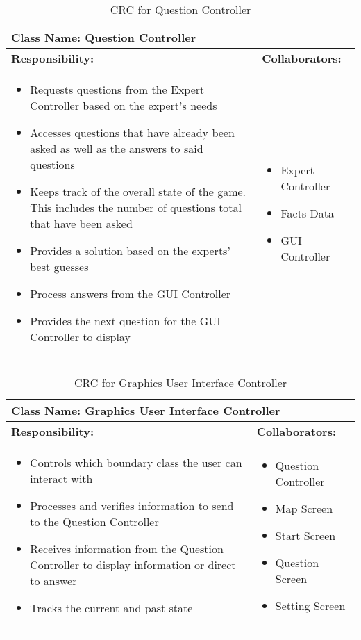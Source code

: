 \documentclass[titlepage]{article}
\begin{document}
	
	\begin{longtable}{| p{} | p{} |}
			\hline
			 \multicolumn{2}{|l|}{\textbf{Class Name: Question Controller}} \\
			\hline
			\textbf{Responsibility:} & \textbf{Collaborators:} \\
			\hline
				\begin{itemize}
					\item Requests questions from the Expert Controller based on the expert's needs
					\item Accesses questions that have already been asked as well as the answers to said questions
					\item Keeps track of the overall state of the game. This includes the number of questions total that have been asked
					\item Provides a solution based on the experts' best guesses
					\item Process answers from the GUI Controller
					\item Provides the next question for the GUI Controller to display
				\end{itemize} & 
				\begin{itemize}
					\item Expert Controller
					\item Facts Data
					\item GUI Controller
				\end{itemize} 
				\\
			\hline
		\caption{CRC for Question Controller}
	\end{longtable}
	
\newpage	
	\begin{longtable}{| p{} | p{} |}
			\hline
			 \multicolumn{2}{|l|}{\textbf{Class Name: Graphics User Interface Controller}} \\
			\hline
			\textbf{Responsibility:} & \textbf{Collaborators:} \\
			\hline
				\begin{itemize}
					\item Controls which boundary class the user can interact with
					\item Processes and verifies information to send to the Question Controller
					\item Receives information from the Question Controller to display information or direct to answer
					\item Tracks the current and past state
				\end{itemize} & 
				\begin{itemize}
					\item Question Controller
					\item Map Screen
					\item Start Screen
					\item Question Screen
					\item Setting Screen
				\end{itemize} 
				\\
			\hline
		\caption{CRC for Graphics User Interface Controller}
	\end{longtable}
	
\end{document}
